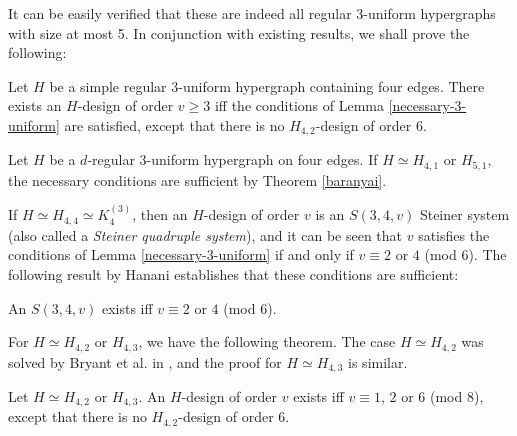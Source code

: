 It can be easily verified that these are indeed all regular $3$-uniform hypergraphs with size at most 5. %
In conjunction with existing results, we shall prove the following:

\begin{theorem} \label{thm:regular-4}
Let $H$ be a simple regular $3$-uniform hypergraph containing four edges.
There exists an $H$-design of order $v \geq 3$ iff the conditions of Lemma \ref{necessary-3-uniform} are satisfied,
  except that there is no $H_{4,2}$-design of order $6$.
\end{theorem}

Let $H$ be a $d$-regular $3$-uniform hypergraph on four edges.
If $H \simeq H_{4,1}$ or $H_{5,1}$, the necessary conditions are sufficient by Theorem \ref{baranyai}.

If $H \simeq H_{4,4} \simeq K_4^{(3)}$, then an $H$-design of order $v$ is an $S(3, 4, v)$ Steiner system (also called a {\em Steiner quadruple system}),
  and it can be seen that $v$ satisfies the conditions of Lemma \ref{necessary-3-uniform} if and only if $v \equiv 2$ or $4$ (mod $6$).
The following result by Hanani establishes that these conditions are sufficient:

\begin{theorem} \label{thm:K4^3}
An $S(3, 4, v)$ exists iff $v \equiv 2$ or $4$ (mod $6$).
\end{theorem}


For $H \simeq H_{4,2}$ or $H_{4,3}$, we have the following theorem.
The case $H \simeq H_{4,2}$ was solved by Bryant et al. in \cite{bryant}, and the proof for $H \simeq H_{4,3}$ is similar.

\begin{theorem} \label{thm:H_42,H_43}
Let $H \simeq H_{4,2}$ or $H_{4,3}$.
An $H$-design of order $v$ exists iff $v \equiv 1$, $2$ or $6$ (mod $8$),
  except that there is no $H_{4,2}$-design of order $6$.
\end{theorem}


